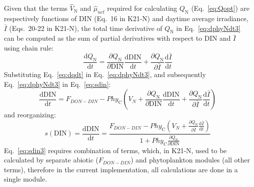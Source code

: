 \documentclass[gmd, manuscript]{copernicus}
\begin{document}
Given that the terms $\hat{V}_\text{N}$ and $\hat{\mu}_{net}$ required for calculating $Q_\text{N}$ (Eq.~\ref{eq:Qopt}) are respectively functions of DIN (Eq.~16 in K21-N) and daytime average irradiance, $\bar{I}$ (Eqs.~20-22 in K21-N), the total time derivative of $Q_\text{N}$ in Eq.~\ref{eq:dphyNdt3} can be computed as the sum of partial derivatives with respect to DIN and $\bar{I}$ using chain rule: 
\begin{equation} \label{eq:dqdt}
 \frac{\text{d} Q_\text{N}}{\text{d} t} = \frac{\partial Q_\text{N}}{\partial \text{DIN}} \frac{\text{d} \text{DIN}}{\text{d} t} +  \frac{\partial Q_\text{N}}{\partial \bar{I}} \frac{\text{d} \bar{I}}{\text{d} t} 
\end{equation}
Substituting Eq.~\ref{eq:dqdt} in Eq.~\ref{eq:dphyNdt3}, and subsequently Eq.~\ref{eq:dphyNdt3} in Eq.~\ref{eq:sdin}:
\begin{equation}\label{eq:sdin2}
 \frac{\text{d}\text{DIN}}{\text{d}t} = F_{DON-DIN} - Phy_{\text{C}} \left(V_N + \frac{\partial Q_\text{N}}{\partial \text{DIN}} \frac{\text{d} \text{DIN}}{\text{d} t} +  \frac{\partial Q_\text{N}}{\partial \bar{I}} \frac{\text{d} \bar{I}}{\text{d} t} \right)
\end{equation}
and reorganizing:
\begin{equation}\label{eq:sdin3}
 s(\text{DIN}) = \frac{\text{d}\text{DIN}}{\text{d}t} = \frac{F_{DON-DIN} - Phy_{\text{C}} \left(V_N +  \frac{\partial Q_\text{N}}{\partial \bar{I}} \frac{\text{d} \bar{I}}{\text{d} t} \right)}{ 1+Phy_{\text{C}}\frac{\partial Q_\text{N}}{\partial \text{DIN}}}
\end{equation}
Eq.~\ref{eq:sdin3} requires combination of terms, which, in K21-N, used to be calculated by separate abiotic ($F_{DON-DIN}$) and phytoplankton modules (all other terms), therefore in the current implementation, all calculations are done in a single module.
\end{document}
